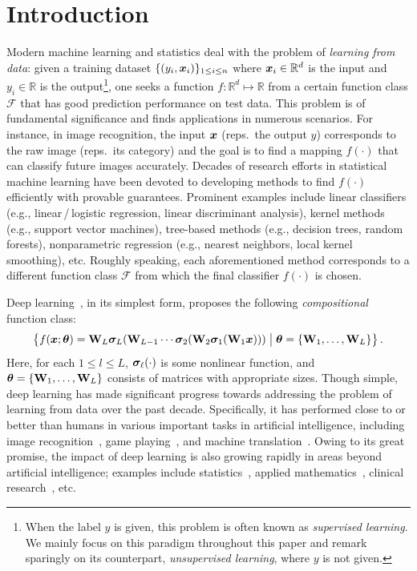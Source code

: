 \section{Introduction}\label{sec:intro}
Modern machine learning and statistics deal with the problem of \emph{learning from data}: given a training dataset $\{(y_i,\text{\boldmath $x$}_i)\}_{1\leq i \leq n}$ where $\text{\boldmath $x$}_i \in \mathbb{R}^{d}$ is the input and $y_i \in \mathbb{R}$ is the output\footnote{When the label $y$ is given, this problem is often known as \emph{supervised learning}. We mainly focus on this paradigm throughout this paper and remark sparingly on its counterpart, \emph{unsupervised learning}, where $y$ is not given.}, one seeks a function $f: \mathbb{R}^{d} \mapsto \mathbb{R}$ from a certain function class $\mathcal{F}$ that has good prediction performance on test data. This problem is of fundamental significance and finds applications in numerous scenarios. For instance, in image recognition, the input $\text{\boldmath $x$}$ (reps.~the output $y$) corresponds to the raw image (reps.~its category) and the goal is to find a mapping $f(\cdot)$ that can classify future images accurately. Decades of research efforts in statistical machine learning have been devoted to developing methods to find $f(\cdot)$ efficiently with provable guarantees. Prominent examples include linear classifiers (e.g., linear$\,$/$\,$logistic regression, linear discriminant analysis), kernel methods (e.g., support vector machines), tree-based methods (e.g., decision trees, random forests), nonparametric regression (e.g., nearest neighbors, local kernel smoothing), etc. Roughly speaking, each aforementioned method corresponds to a different function class $\mathcal{F}$ from which the final classifier $f(\cdot)$ is chosen.

Deep learning~\citep{lecun2015deep}, in its simplest form, proposes the following \emph{compositional} function class:
\begin{equation}\label{model:1}
\left\{f(\text{\boldmath $x$}; \text{\boldmath $\theta$}) = \mathrm{\bf W}_{L} \bm{\sigma}_L(\mathrm{\bf W}_{L-1}\cdots \bm{\sigma}_{2}(\mathrm{\bf W}_2 \bm{\sigma}_1(\mathrm{\bf W}_1 \text{\boldmath $x$}))) \;\big| \;\text{\boldmath $\theta$} = \{\mathrm{\bf W}_1,\ldots, \mathrm{\bf W}_{L}\}\right\}.
\end{equation}
Here, for each $1\leq l \leq L$, $\bm{\sigma}_\ell(\cdot)$ is some nonlinear function, and $\text{\boldmath $\theta$} = \{\mathrm{\bf W}_1,\ldots, \mathrm{\bf W}_{L}\}$ consists of matrices with appropriate sizes. Though simple, deep learning has made significant progress towards addressing the problem of learning from data over the past decade. Specifically, it has performed close to or better than humans in various important tasks in artificial intelligence, including image recognition~\citep{he2016deep}, game playing~\citep{silver2017mastering}, and machine translation~\citep{wu2016google}. Owing to its great promise, the impact of deep learning is also growing rapidly in areas beyond artificial intelligence; examples include statistics~\citep{bauer2017deep, schmidt2017nonparametric, liang2017well, romano2018deep,gao2018robust}, applied mathematics~\citep{weinan2017deep, chen2018neural}, clinical research~\citep{de2018clinically}, etc.

